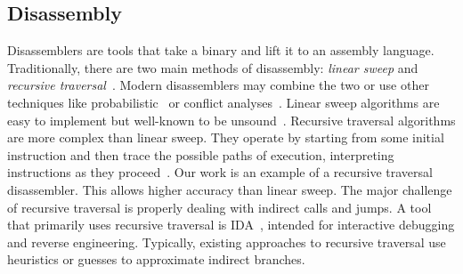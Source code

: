 \subsection{Disassembly}
Disassemblers are tools that take a binary and lift it to an assembly language.
Traditionally, there are two main methods of disassembly: \emph{linear sweep}
and \emph{recursive traversal}~\cite{schwartz2002disassembly}.
Modern disassemblers may combine the two or use other techniques like probabilistic~\cite{wartell2011differentiating,wartell2014shingled,miller2019probabilistic} or conflict analyses~\cite{khadra2016speculative}.
Linear sweep algorithms are easy to implement but well-known to be unsound~\cite{schwartz2002disassembly}.
Recursive traversal algorithms are more complex than linear sweep.
They operate by starting from some initial instruction and then trace the possible paths of execution, interpreting instructions as they proceed~\cite{schwartz2002disassembly,kruegel2004static}.
Our work is an example of a recursive traversal disassembler.
This allows higher accuracy than linear sweep.
The major challenge of recursive traversal is properly dealing with indirect calls and jumps.
A tool that primarily uses recursive traversal is IDA~\cite{ida}, intended for interactive debugging and reverse engineering.
Typically, existing approaches to recursive traversal use heuristics or guesses to approximate indirect branches.

